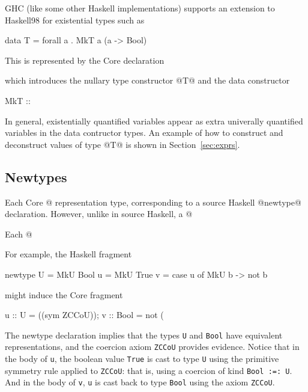 \documentclass[10pt]{article}
\begin{document}
GHC (like some other Haskell implementations) supports an extension to Haskell98 
for existential types such as 
\begin{code}
data T = forall a . MkT a (a -> Bool)
\end{code}
This is represented by the Core declaration
\begin{code}
\end{code}
which introduces the nullary type constructor @T@ and the data constructor
\begin{code}
MkT :: %
\end{code}
In general, existentially quantified variables appear as extra univerally
quantified variables in the data contructor types.
An example of how to construct and deconstruct values of type @T@ is shown in 
Section~\ref{sec:exprs}.

\subsection{Newtypes}
\label{sec:newtypes}

Each Core @%
representation type, corresponding to a source Haskell @newtype@
declaration. However, unlike in source Haskell, a @%

Each @%

For example, the Haskell fragment
\begin{code}
newtype U = MkU Bool
u = MkU True
v = case u of
  MkU b -> not b
\end{code}
might induce the Core fragment
\begin{code}
u :: U = %
           ((sym ZCCoU));
v :: Bool = not (%
\end{code}

The newtype declaration implies that the types {\tt U} and {\tt Bool} have equivalent representations, and the coercion axiom {\tt ZCCoU} provides evidence. Notice that in the body of {\tt u}, the boolean value {\tt True} is cast to type {\tt U} using the primitive symmetry rule applied to {\tt ZCCoU}: that is, using a coercion of kind {\tt Bool :=: U}. And in the body of {\tt v}, {\tt u} is cast back to type {\tt Bool} using the axiom {\tt ZCCoU}.
\end{document}
